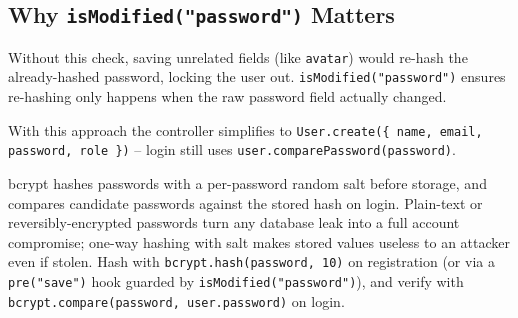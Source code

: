 \subsection{Why \texttt{isModified("password")} Matters}

Without this check, saving unrelated fields (like \texttt{avatar}) would re-hash the already-hashed password, locking the user out. \texttt{isModified("password")} ensures re-hashing only happens when the raw password field actually changed.

\begin{tipbox}[TIP]
With this approach the controller simplifies to \texttt{User.create(\{ name, email, password, role \})} -- login still uses \texttt{user.comparePassword(password)}.
\end{tipbox}

\whatwhyhow
{bcrypt hashes passwords with a per-password random salt before storage, and compares candidate passwords against the stored hash on login.}
{Plain-text or reversibly-encrypted passwords turn any database leak into a full account compromise; one-way hashing with salt makes stored values useless to an attacker even if stolen.}
{Hash with \texttt{bcrypt.hash(password, 10)} on registration (or via a \texttt{pre("save")} hook guarded by \texttt{isModified("password")}), and verify with \texttt{bcrypt.compare(password, user.password)} on login.}

